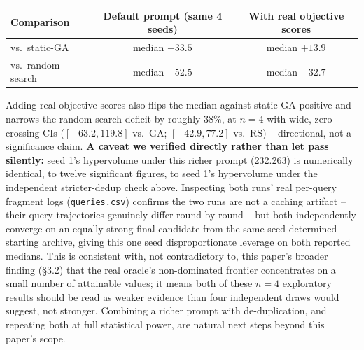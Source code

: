 \documentclass{article}
\begin{document}
\begin{center}
\begin{tabular}{lcc}
\toprule
Comparison & Default prompt (same 4 seeds) & With real objective scores \\
\midrule
vs.\ static-GA & median $-33.5$ & median $\mathbf{+13.9}$ \\
vs.\ random search & median $-52.5$ & median $-32.7$ \\
\bottomrule
\end{tabular}
\end{center}

Adding real objective scores also flips the median against static-GA positive and narrows the random-search deficit by roughly 38\%, at $n=4$ with wide, zero-crossing CIs ($[-63.2,119.8]$ vs.\ GA; $[-42.9,77.2]$ vs.\ RS) -- directional, not a significance claim. \textbf{A caveat we verified directly rather than let pass silently:} seed 1's hypervolume under this richer prompt (232.263) is numerically identical, to twelve significant figures, to seed 1's hypervolume under the independent stricter-dedup check above. Inspecting both runs' real per-query fragment logs (\texttt{queries.csv}) confirms the two runs are not a caching artifact -- their query trajectories genuinely differ round by round -- but both independently converge on an equally strong final candidate from the same seed-determined starting archive, giving this one seed disproportionate leverage on both reported medians. This is consistent with, not contradictory to, this paper's broader finding (\S3.2) that the real oracle's non-dominated frontier concentrates on a small number of attainable values; it means both of these $n=4$ exploratory results should be read as weaker evidence than four independent draws would suggest, not stronger. Combining a richer prompt with de-duplication, and repeating both at full statistical power, are natural next steps beyond this paper's scope.
\end{document}
